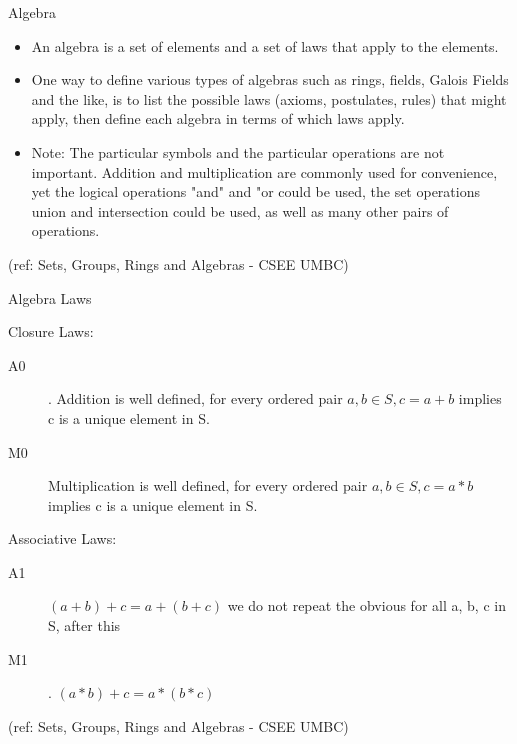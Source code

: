 \begin{frame}{Algebra}

\begin{itemize}
\item  An algebra is a set of elements and a set of laws that apply to the elements.

\item One way to define various types of algebras such as rings, fields, Galois
Fields and the like, is to list the possible laws (axioms, postulates, rules)
that might apply, then define each algebra in terms of which laws apply.

\item Note: The particular symbols and the particular operations are not important.
      Addition and multiplication are commonly used for convenience, yet the
      logical operations "and" and "or could be used, the set operations
      union and intersection could be used, as well as many other pairs of
      operations.
\end{itemize}


\tiny{(ref: Sets, Groups, Rings and Algebras - CSEE UMBC)}

\end{frame}

\begin{frame}{Algebra Laws}

Closure Laws:
\begin{description}
\item[A0]. Addition is well defined, for every ordered pair
                      $a, b \in S, c = a+b$ implies c is a unique element in S.
\item[M0] Multiplication is well defined, for every ordered pair
                      $a, b \in S, c = a*b$ implies c is a unique element in S.
\end{description}

Associative Laws: 
\begin{description}
\item[A1] $(a+b)+c = a+(b+c)$  {we do not repeat the obvious  
                                          for all a, b, c in S, after this}
\item[M1]. $(a*b)+c = a*(b*c)$
\end{description}
					
									
\tiny{(ref: Sets, Groups, Rings and Algebras - CSEE UMBC)}

\end{frame}


